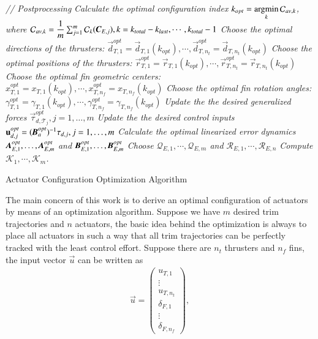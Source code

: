 \begin{algorithm}
\SetAlgoLined
{}
\emph{// Postprocessing}\;
\emph{Calculate the optimal configuration index $k_{opt}=\displaystyle \argmin_{k}\mathcal{C}_{av,k}$, where $\mathcal{C}_{av,k}=\dfrac{1}{m}\sum_{j=1}^{m}\mathcal{C}_{k}(\emph{\textbf{C}}_{E,j}), k=k_{total}-k_{last}, \cdots, k_{total}-1$}\;
\emph{Choose the optimal directions of the thrusters: 
$\vec{d}_{T,1}^{opt}=\vec{d}_{T,1}(k_{opt}), \cdots,\vec{d}_{T,n_{t}}^{opt}=\vec{d}_{T,n_{t}}(k_{opt})$}\;
\emph{Choose the optimal positions of the thrusters: 
$\vec{r}_{T,1}^{opt}=\vec{r}_{T,1}(k_{opt}), \cdots,\vec{r}_{T,n_{t}}^{opt}=\vec{r}_{T,n_{t}}(k_{opt})$}\;
\emph{Choose the optimal fin geometric centers: 
$x_{T,1}^{opt}=x_{T,1}(k_{opt}), \cdots,x_{T,n_{f}}^{opt}=x_{T,n_{f}}(k_{opt})$}\;
\emph{Choose the optimal fin rotation angles: 
$\gamma_{T,1}^{opt}=\gamma_{T,1}(k_{opt}), \cdots,\gamma_{T,n_{f}}^{opt}=\gamma_{T,n_{f}}(k_{opt})$}\;
\emph{Update the the desired generalized forces $\vec{\tau}_{d,\mathcal{T}_{j}}^{opt}, j=1, \ldots, m$}\;
\emph{Update the the desired control inputs $\vec{u}_{d,j}^{opt}=(\emph{\textbf{B}}_{a}^{opt})^{-1}\vec{\tau}_{d,j}, j=1, \ldots, m$}\;
\emph{Calculate the optimal linearized error dynamics $\emph{\textbf{A}}_{E,1}^{opt}, \ldots, \emph{\textbf{A}}_{E,m}^{opt}$ and $\emph{\textbf{B}}_{E,1}^{opt}, \ldots, \emph{\textbf{B}}_{E,m}^{opt}$}\;
\emph{Choose $\mathcal{Q}_{E,1}, \cdots, \mathcal{Q}_{E,m}$ and $\mathcal{R}_{E,1}, \cdots, \mathcal{R}_{E,n}$ }\;
\emph{Compute $\mathcal{K}_{1}, \cdots, \mathcal{K}_{m}$.}\\
\BlankLine
\BlankLine
\BlankLine
\caption{Actuator Configuration Optimization Algorithm}\label{algo_actuator_optimization2}
\end{algorithm}
\DecMargin{1em}
The main concern of this work is to derive an optimal configuration of actuators by means of an optimization algorithm. 
Suppose we have $m$ desired trim trajectories and $n$ actuators, the basic idea behind the optimization is always to place all actuators in such a way that all trim trajectories can be perfectly tracked with the least control effort. Suppose there are $n_{t}$ thrusters and $n_{f}$ fins, the input vector $\vec{u}$ can be written as
\begin{align}
\vec{u}=\begin{pmatrix}
u_{T,1}\\ \vdots \\ u_{T,n_{t}} \\ \delta_{F,1} \\ \vdots \\ \delta_{F,n_{f}}
\end{pmatrix},
\end{align}
